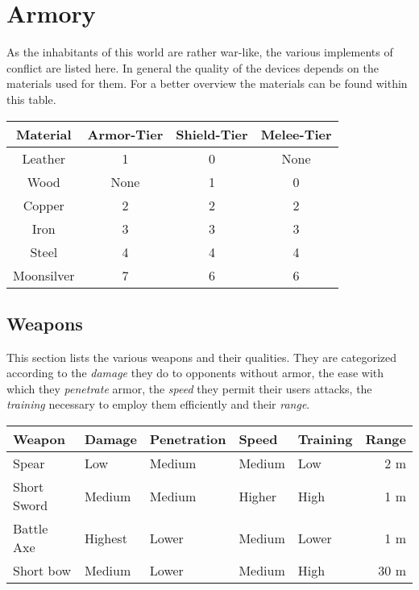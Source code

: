 \section{Armory}\label{ch:Goods:Armory}
As the inhabitants of this world are rather war-like, the various implements of
conflict are listed here. In general the quality of the devices depends on the
materials used for them. For a better overview the materials can be found
within this table.

\begin{longtable}{cccc}
	\toprule
	Material   & Armor-Tier & Shield-Tier & Melee-Tier \\
	\midrule
	Leather    & 1          & 0           & None       \\
	Wood       & None       & 1           & 0          \\
	Copper     & 2          & 2           & 2          \\
	Iron       & 3          & 3           & 3          \\
	Steel      & 4          & 4           & 4          \\
	Moonsilver & 7          & 6           & 6          \\ \bottomrule
\end{longtable}

\subsection{Weapons}\label{ch:Goods:Armory:Weapons}
This section lists the various weapons and their qualities. They are
categorized according to the \emph{damage} they do to opponents without armor,
the ease with which they \emph{penetrate} armor, the \emph{speed} they permit
their users attacks, the \emph{training} necessary to employ them efficiently
and their \emph{range}.

\begin{longtable}{lllllr}
	\toprule
	Weapon
	       & Damage  & Penetration
	       & Speed   & Training    & Range \\
	\midrule
	Spear
	       & Low     & Medium
	       & Medium  & Low         & 2 m   \\
	Short Sword
	       & Medium  & Medium
	       & Higher  & High        & 1 m   \\
	Battle Axe
	       & Highest & Lower
	       & Medium  & Lower       & 1 m   \\
	Short bow
	       & Medium  & Lower       &
	Medium & High    & 30 m                \\
	\bottomrule
\end{longtable}

